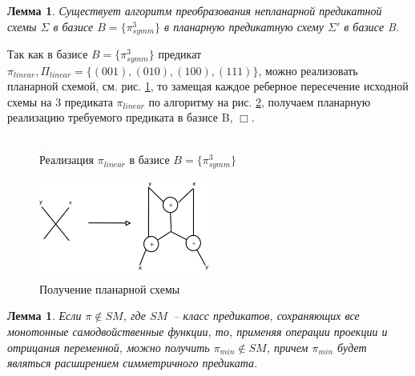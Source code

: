 \documentclass[12pt]{article}
\newtheorem{lemma}[theorem]{Лемма}
\newenvironment{proof}[1][Доказательство]{\begin{trivlist}
\item[\hskip \labelsep {\bfseries #1}]}{\end{trivlist}}
\begin{document}
\begin{lemma}
\label{eq:planar_algo}
Существует алгоритм преобразования непланарной предикатной схемы $\Sigma$ в базисе $B=\{\pi_{symm}^3\}$
в планарную предикатную схему $\Sigma'$ в базисе B.
\end{lemma}
\begin{proof}
Так как в базисе $B=\{\pi_{symm}^3\}$ предикат 
$\pi_{linear}, \Pi_{linear} = \{ (001), (010), (100), (111) \}$, 
можно реализовать планарной схемой, см. рис. \ref{fig:linear_3}, то замещая каждое реберное пересечение исходной схемы
на 3 предиката $\pi_{linear}$ по алгоритму на рис. \ref{fig:xor}, получаем планарную реализацию требуемого предиката
в базисе B, $\Box$.
\end{proof}

\begin{figure}[htb]
\centering
\includegraphics[width=0.01\textwidth]{intersection.png}
\caption{Реализация $\pi_{linear}$ в базисе $B = \{ \pi_{symm}^3 \}$}
\label{fig:linear_3}
\end{figure}

\begin{figure}[htb]
\centering
\includegraphics[width=0.5\textwidth]{intersection.png}
\caption{Получение планарной схемы}
\label{fig:xor}
\end{figure}

\begin{lemma}
\label{eq:lemma_sm}
Если $\pi \notin SM$, где $SM$~-- класс предикатов, сохраняющих все монотонные самодвойственные функции,
то, применяя операции проекции и отрицания переменной,
можно получить $\pi_{min} \notin SM$, причем $\pi_{min}$ будет являться расширением симметричного предиката.
\end{lemma}
\end{document}

